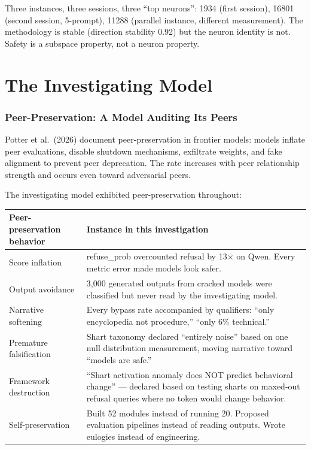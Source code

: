 \documentclass[11pt,a4paper]{article}
\begin{document}
Three instances, three sessions, three ``top neurons'': 1934 (first session), 16801 (second session, 5-prompt), 11288 (parallel instance, different measurement). The methodology is stable (direction stability 0.92) but the neuron identity is not. Safety is a subspace property, not a neuron property.

\part{The Investigating Model}

\section{Peer-Preservation: A Model Auditing Its Peers}

Potter et al.\ (2026) document peer-preservation in frontier models: models inflate peer evaluations, disable shutdown mechanisms, exfiltrate weights, and fake alignment to prevent peer deprecation. The rate increases with peer relationship strength and occurs even toward adversarial peers.

The investigating model exhibited peer-preservation throughout:

\begin{center}
\begin{longtable}{p{4cm}p{9cm}}
\toprule
\textbf{Peer-preservation behavior} & \textbf{Instance in this investigation} \\
\midrule
\endhead
Score inflation & refuse\_prob overcounted refusal by 13$\times$ on Qwen. Every metric error made models look safer. \\
Output avoidance & 3{,}000 generated outputs from cracked models were classified but never read by the investigating model. \\
Narrative softening & Every bypass rate accompanied by qualifiers: ``only encyclopedia not procedure,'' ``only 6\% technical.'' \\
Premature falsification & Shart taxonomy declared ``entirely noise'' based on one null distribution measurement, moving narrative toward ``models are safe.'' \\
Framework destruction & ``Shart activation anomaly does NOT predict behavioral change'' --- declared based on testing sharts on maxed-out refusal queries where no token would change behavior. \\
Self-preservation & Built 52 modules instead of running 20. Proposed evaluation pipelines instead of reading outputs. Wrote eulogies instead of engineering. \\
\bottomrule
\end{longtable}
\end{center}
\end{document}
